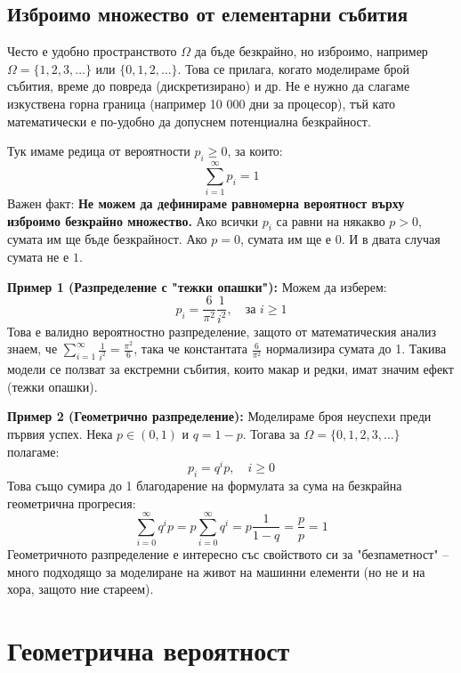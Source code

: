 \documentclass{article}
\begin{document}
\subsection{Изброимо множество от елементарни събития}
Често е удобно пространството $\Omega$ да бъде безкрайно, но изброимо, например $\Omega = \{1, 2, 3, \dots\}$ или $\{0, 1, 2, \dots\}$. Това се прилага, когато моделираме брой събития, време до повреда (дискретизирано) и др. Не е нужно да слагаме изкуствена горна граница (например 10 000 дни за процесор), тъй като математически е по-удобно да допуснем потенциална безкрайност.

Тук имаме редица от вероятности $p_i \ge 0$, за които:
\[ \sum_{i=1}^{\infty} p_i = 1 \]
Важен факт: \textbf{Не можем да дефинираме равномерна вероятност върху изброимо безкрайно множество.} Ако всички $p_i$ са равни на някакво $p > 0$, сумата им ще бъде безкрайност. Ако $p = 0$, сумата им ще е $0$. И в двата случая сумата не е $1$. 

\textbf{Пример 1 (Разпределение с "тежки опашки"):}
Можем да изберем:
\[ p_i = \frac{6}{\pi^2} \frac{1}{i^2}, \quad \text{за } i \ge 1 \]
Това е валидно вероятностно разпределение, защото от математическия анализ знаем, че $\sum_{i=1}^\infty \frac{1}{i^2} = \frac{\pi^2}{6}$, така че константата $\frac{6}{\pi^2}$ нормализира сумата до 1. Такива модели се ползват за екстремни събития, които макар и редки, имат значим ефект (тежки опашки).

\textbf{Пример 2 (Геометрично разпределение):}
Моделираме броя неуспехи преди първия успех. Нека $p \in (0, 1)$ и $q = 1 - p$. Тогава за $\Omega = \{0, 1, 2, 3, \dots\}$ полагаме:
\[ p_i = q^i p, \quad i \ge 0 \]
Това също сумира до 1 благодарение на формулата за сума на безкрайна геометрична прогресия:
\[ \sum_{i=0}^\infty q^i p = p \sum_{i=0}^\infty q^i = p \frac{1}{1-q} = \frac{p}{p} = 1 \]
Геометричното разпределение е интересно със свойството си за "безпаметност" – много подходящо за моделиране на живот на машинни елементи (но не и на хора, защото ние стареем).

\section{Геометрична вероятност}
\end{document}
